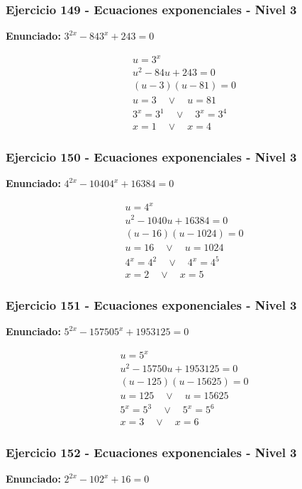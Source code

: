 \documentclass[12pt,a4paper]{article}
\begin{document}
\subsubsection*{Ejercicio 149 - Ecuaciones exponenciales - Nivel 3}
\textbf{Enunciado:} \(3^{2x}-843^x+243=0\)

\[
\begin{aligned}
u=3^x\\
u^2-84u+243=0\\
(u-3)(u-81)=0\\
u=3\quad \vee\quad u=81\\
3^x=3^{1}\quad \vee\quad 3^x=3^{4}\\
\boxed{x=1\quad \vee\quad x=4}
\end{aligned}
\]


\subsubsection*{Ejercicio 150 - Ecuaciones exponenciales - Nivel 3}
\textbf{Enunciado:} \(4^{2x}-10404^x+16384=0\)

\[
\begin{aligned}
u=4^x\\
u^2-1040u+16384=0\\
(u-16)(u-1024)=0\\
u=16\quad \vee\quad u=1024\\
4^x=4^{2}\quad \vee\quad 4^x=4^{5}\\
\boxed{x=2\quad \vee\quad x=5}
\end{aligned}
\]


\subsubsection*{Ejercicio 151 - Ecuaciones exponenciales - Nivel 3}
\textbf{Enunciado:} \(5^{2x}-157505^x+1953125=0\)

\[
\begin{aligned}
u=5^x\\
u^2-15750u+1953125=0\\
(u-125)(u-15625)=0\\
u=125\quad \vee\quad u=15625\\
5^x=5^{3}\quad \vee\quad 5^x=5^{6}\\
\boxed{x=3\quad \vee\quad x=6}
\end{aligned}
\]


\subsubsection*{Ejercicio 152 - Ecuaciones exponenciales - Nivel 3}
\textbf{Enunciado:} \(2^{2x}-102^x+16=0\)
\end{document}
